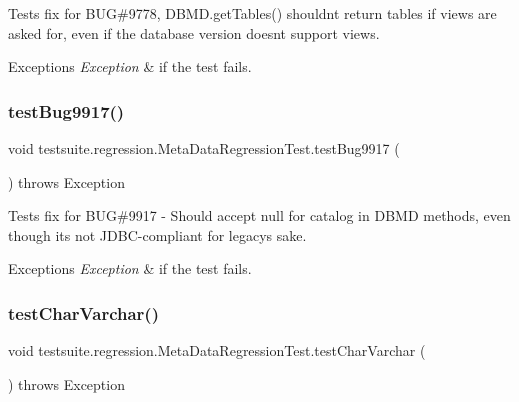 Tests fix for B\+UG\#9778, D\+B\+M\+D.\+get\+Tables() shouldn\textquotesingle{}t return tables if views are asked for, even if the database version doesn\textquotesingle{}t support views.


\begin{DoxyExceptions}{Exceptions}
{\em Exception} & if the test fails. \\
\hline
\end{DoxyExceptions}
\mbox{\label{classtestsuite_1_1regression_1_1_meta_data_regression_test_a091172fd69f6c74846e6d1d59d889924}} 
\subsubsection{\texorpdfstring{test\+Bug9917()}{testBug9917()}}
{\footnotesize\ttfamily void testsuite.\+regression.\+Meta\+Data\+Regression\+Test.\+test\+Bug9917 (\begin{DoxyParamCaption}{ }\end{DoxyParamCaption}) throws Exception}

Tests fix for B\+UG\#9917 -\/ Should accept null for catalog in D\+B\+MD methods, even though it\textquotesingle{}s not J\+D\+B\+C-\/compliant for legacy\textquotesingle{}s sake.


\begin{DoxyExceptions}{Exceptions}
{\em Exception} & if the test fails. \\
\hline
\end{DoxyExceptions}
\mbox{\label{classtestsuite_1_1regression_1_1_meta_data_regression_test_a34109c03092379ea3c085035c26f8343}} 
\subsubsection{\texorpdfstring{test\+Char\+Varchar()}{testCharVarchar()}}
{\footnotesize\ttfamily void testsuite.\+regression.\+Meta\+Data\+Regression\+Test.\+test\+Char\+Varchar (\begin{DoxyParamCaption}{ }\end{DoxyParamCaption}) throws Exception}

